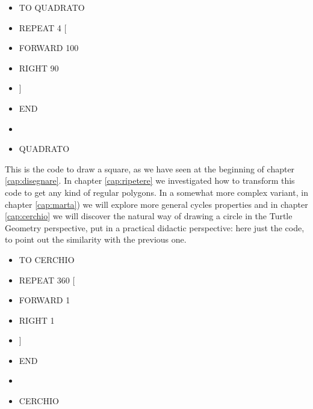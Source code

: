\begin{scriptsize}
\begin{minipage}{0.50\textwidth}
\begin{itemize}[itemsep=-3pt,parsep=2pt, leftmargin=-0.0mm ]
\item[] TO QUADRATO                 
\item[] \hspace{8pt} 	REPEAT 4 [ 
\item[] \hspace{8pt}\hspace{8pt}		FORWARD 100 
\item[] \hspace{8pt}\hspace{8pt}		RIGHT 90
\item[] \hspace{8pt}	]
\item[] END                            
\item[] 
\item[] QUADRATO
\end{itemize}
\end{minipage}
\end{scriptsize}

\vskip 1cm

This is the code to draw a square, as we have seen at the beginning of chapter \ref{cap:disegnare}. In chapter \ref{cap:ripetere} we investigated how to transform this code to get any kind of regular polygons. In a somewhat more complex variant, in chapter \ref{cap:marta}) we will explore more general cycles properties and in chapter \ref{cap:cerchio} we will discover the natural way of drawing a circle in the Turtle Geometry perspective, put in a practical didactic perspective: here just the code, to point out the similarity with the previous one.

\vskip 1cm

\begin{scriptsize}
\begin{minipage}{0.50\textwidth}
\begin{itemize}[itemsep=-3pt,parsep=2pt, leftmargin=-0.0mm ]
\item[] TO CERCHIO                 
\item[] \hspace{8pt} 	REPEAT 360 [ 
\item[] \hspace{8pt}\hspace{8pt}		FORWARD 1 
\item[] \hspace{8pt}\hspace{8pt}		RIGHT 1
\item[] \hspace{8pt}	]
\item[] END                            
\item[] 
\item[] CERCHIO
\end{itemize}
\end{minipage}
\end{scriptsize}


